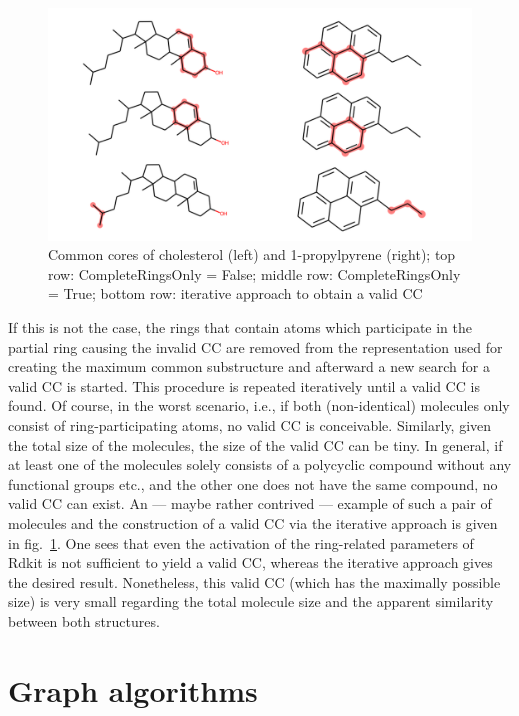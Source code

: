 \begin{figure}
	\includegraphics[scale=0.6]{cholesterol_pryenepropanoic_acid.png}
	
	\caption{Common cores of cholesterol (left) and 1-propylpyrene (right); top row: CompleteRingsOnly = False; middle row: CompleteRingsOnly = True; bottom row: iterative approach to obtain a valid {\trafo} CC}
	\label{fig:pyrene}
\end{figure}

If this is not the case, the rings that contain atoms which participate in the partial ring causing the invalid CC are removed from the representation used for creating the maximum common substructure and afterward a new search for a valid CC is started. This procedure is repeated iteratively until a valid CC is found.
Of course, in the worst scenario, i.e., if both (non-identical) molecules only consist of ring-participating atoms, no valid CC is conceivable. Similarly, given the total size of the molecules, the size of the valid CC can be tiny. In general, if at least one of the molecules solely consists of a polycyclic compound without any functional groups etc., and the other one does not have the same compound, no valid CC can exist. 
An --- maybe rather contrived --- example of such a pair of molecules and the construction of a valid CC via the iterative approach is given in fig.~\ref{fig:pyrene}. One sees that even the activation of the ring-related parameters of Rdkit is not sufficient to yield a valid CC, whereas the iterative approach gives the desired result. Nonetheless, this valid CC (which has the maximally possible size) is very small regarding the total molecule size and the apparent similarity between both structures.



\section{Graph algorithms}

